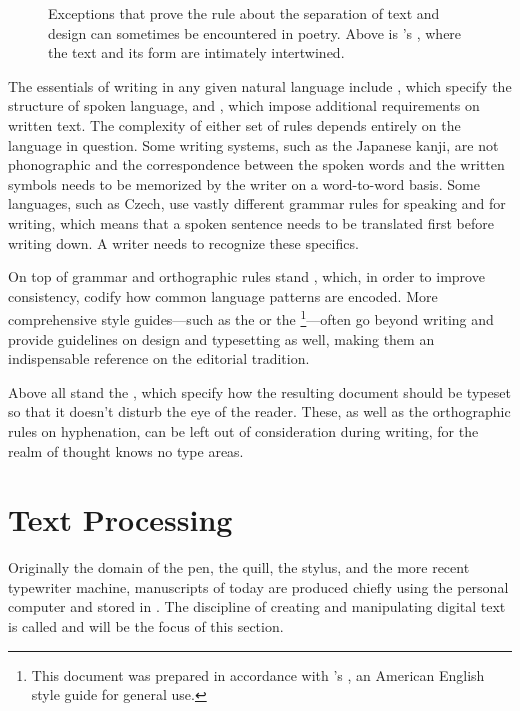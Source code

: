 \documentclass[a5paper,10pt]{book}
\begin{document}
\begin{figure}
  
  \caption{Exceptions that prove the rule about the separation of text and
    design can sometimes be encountered in poetry. Above is 's , where the text and its
    form are intimately intertwined.}
\end{figure}

The essentials of writing in any given natural language include , which specify the structure of spoken
language, and , which
impose additional requirements on written text. The complexity of either set of
rules depends entirely on the language in question. Some writing systems, such
as the Japanese kanji, are not phonographic and the correspondence between
the spoken words and the written symbols needs to be memorized by the writer on
a word-to-word basis. Some languages, such as Czech, use vastly different
grammar rules for speaking and for writing, which means that a spoken sentence
needs to be translated first before writing down. A writer needs to recognize
these specifics.

On top of grammar and orthographic rules stand , which, in
order to improve consistency, codify how common language patterns are encoded.
More comprehensive style guides---such as the  or
the \footnote{
  This document was prepared in accordance with 's
  , an American English style guide for general use. 
}---often go beyond writing and provide guidelines on design and typesetting as
well, making them an indispensable reference on the editorial tradition.

Above all stand the ,
which specify how the resulting document should be typeset so that it doesn't
disturb the eye of the reader. These, as well as the orthographic rules on
hyphenation, can be left out of consideration during writing, for the realm of
thought knows no type areas.

\section{Text Processing}
Originally the domain of the pen, the quill, the stylus, and the more recent
typewriter machine, manuscripts of today are produced chiefly using the personal
computer and stored in . The discipline of creating and
manipulating digital text is called  and will be the focus
of this section.
\end{document}
